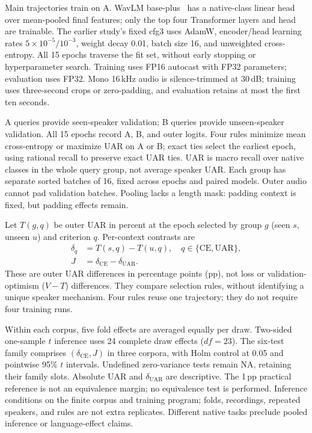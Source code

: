 Main trajectories train on A. WavLM base-plus~\cite{wavlm} has a
native-class linear head over mean-pooled final features; only the top
four Transformer layers and head are trainable. The earlier study's fixed
cfg3 uses AdamW,
encoder/head learning rates $5\times10^{-5}/10^{-3}$, weight decay 0.01,
batch size 16, and unweighted cross-entropy. All 15 epochs traverse the
fit set, without early stopping or hyperparameter search. Training uses
FP16 autocast with FP32 parameters; evaluation uses FP32.
Mono 16\,kHz audio is silence-trimmed at 30\,dB; training uses three-second crops
or zero-padding, and evaluation retains at most the first ten seconds.

A queries provide seen-speaker validation; B queries provide unseen-speaker
validation. All 15 epochs record A, B, and outer logits. Four rules minimize
mean cross-entropy or maximize UAR on A or B; exact ties select the earliest
epoch, using rational recall to preserve exact UAR ties.
UAR is macro recall over native classes in the whole query group,
not average speaker UAR. Each group has separate sorted batches of 16,
fixed across epochs and paired models. Outer audio cannot pad validation
batches. Pooling lacks a length mask: padding context is fixed, but padding
effects remain.

Let $T(g,q)$ be outer UAR in percent at the epoch selected by group
$g$ (seen $s$, unseen $u$) and criterion $q$. Per-context contrasts are
\begin{align}
\delta_q &= T(s,q)-T(u,q),\quad q\in\{\mathrm{CE},\mathrm{UAR}\},\\
J &= \delta_{\mathrm{CE}}-\delta_{\mathrm{UAR}}.
\end{align}
These are outer UAR differences in percentage points (pp), not loss or
validation-optimism ($V-T$) differences. They compare selection rules,
without identifying a unique speaker mechanism. Four rules reuse one
trajectory; they do not require four training runs.

Within each corpus, five fold effects are averaged equally per draw.
Two-sided one-sample $t$ inference uses 24 complete draw effects ($df=23$).
The six-test family comprises $(\delta_{\mathrm{CE}},J)$ in three corpora,
with Holm control at 0.05 and pointwise 95\% $t$ intervals.
Undefined zero-variance tests remain NA, retaining their family slots.
Absolute UAR and $\delta_{\mathrm{UAR}}$ are descriptive. The 1\,pp practical
reference is not an equivalence margin; no equivalence test is performed.
Inference conditions on the finite corpus and training program; folds,
recordings, repeated speakers, and rules are not extra replicates.
Different native tasks preclude pooled inference or language-effect claims.


